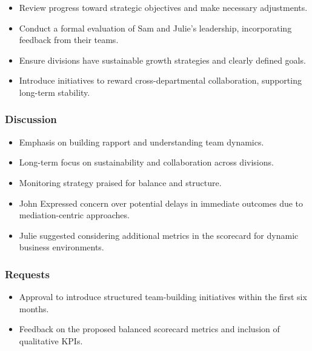 \documentclass[a4paper,12pt]{article}
\begin{document}
\begin{itemize}
    \item Review progress toward strategic objectives and make necessary adjustments.
    \item Conduct a formal evaluation of Sam and Julie’s leadership, incorporating feedback from their teams.
\end{itemize}

\begin{itemize}
    \item Ensure divisions have sustainable growth strategies and clearly defined goals.
    \item Introduce initiatives to reward cross-departmental collaboration, supporting long-term stability.
\end{itemize}

\subsubsection{Discussion}
\begin{itemize}
    \item Emphasis on building rapport and understanding team dynamics.
    \item Long-term focus on sustainability and collaboration across divisions.
    \item Monitoring strategy praised for balance and structure.
\end{itemize}

\begin{itemize}
    \item John Expressed concern over potential delays in immediate outcomes due to mediation-centric approaches.
    \item Julie suggested considering additional metrics in the scorecard for dynamic business environments.
\end{itemize}

\subsubsection{Requests}
\begin{itemize}
    \item Approval to introduce structured team-building initiatives within the first six months.
    \item Feedback on the proposed balanced scorecard metrics and inclusion of qualitative KPIs.
\end{itemize}
\end{document}

